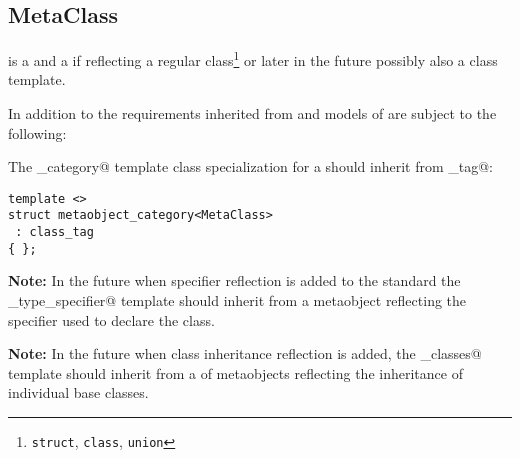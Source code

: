 \subsection{MetaClass}
\label{concept-MetaClass}

 is a  and a  if reflecting a regular
class\footnote{\texttt{struct}, \texttt{class}, \texttt{union}} or later in the future possibly
also a class template.

In addition to the requirements inherited from  and 
models of  are subject to the following:

The \verb@metaobject_category@ template class specialization for a  should
inherit from \verb@class_tag@:

\begin{verbatim}
template <>
struct metaobject_category<MetaClass>
 : class_tag
{ };
\end{verbatim}

\textbf{Note:} In the future when specifier reflection is added
to the standard the \verb@elaborated_type_specifier@ template
should inherit from a metaobject reflecting the specifier used
to declare the class.

\textbf{Note:} In the future when class inheritance reflection
is added, the \verb@base_classes@ template should inherit from
a  of metaobjects reflecting the
inheritance of individual base classes.

